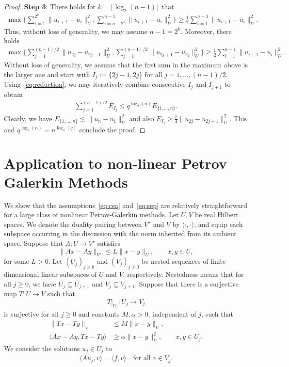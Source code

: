 \documentclass[10pt,reqno]{amsart}
\theoremstyle{definition}
\theoremstyle{remark}
\newcommand{\norm}[1]{\lVert #1\rVert}
\newcommand{\dual}[2]{\langle #1,#2\rangle}
\begin{document}
\begin{proof}
    \textbf{Step 3}: 
    There holds for $k=\lfloor\log_2(n-1)\rfloor$ that
    \begin{align*}
        \max\Big\{\sum_{i=1}^{2^k} \norm{u_{i+1}-u_i}^2_U, \sum_{i=n-2^k}^{n-1} \norm{u_{i+1}-u_i}^2_U\Big\}\geq \frac12 \sum_{i=1}^{n-1} \norm{u_{i+1}-u_i}^2_U.
    \end{align*}
    Thus, without loss of generality, we may assume $n-1=2^k$. Moreover, there holds
    \begin{align*}
        \max\Big\{\sum_{j=1}^{(n-1)/2} \norm{u_{2j}-u_{2j-1}}^2_U, \sum_{j=1}^{(n-1)/2} \norm{u_{2j+1}-u_{2j}}^2_U\Big\}\geq \frac12 \sum_{i=1}^{n-1} \norm{u_{i+1}-u_i}^2_U.
    \end{align*}
    Without loss of generality, we assume that the first sum in the maximum above is the larger one and start with $I_j:= \{2j-1,2j\}$ for all $j=1,\ldots,(n-1)/2$. Using~\eqref{eq:reduction}, we may iteratively combine consecutive $I_j$ and $I_{j+1}$ to obtain
    \begin{align*}
        \sum_{j=1}^{(n-1)/2}E_{I_j}\leq q^{\log_2(n)} E_{\{1,\ldots,n\}}.
    \end{align*}
    Clearly, we have $E_{\{1,\ldots,n\}}\lesssim  \norm{u_n-u_1}_U^2$ and also $E_{I_j}\geq \frac14\norm{u_{2j}-u_{2j-1}}_U^2$.
    This and $q^{\log_2(n)} = n^{\log_2(q)}$ conclude the proof.
\end{proof}

\section{Application to non-linear Petrov Galerkin Methods}\label{sec:pg}
\noindent

We show that the assumptions~\eqref{eq:cea} and~\eqref{eq:sep} are relatively straightforward for a large class of nonlinear Petrov-Galerkin methods.
Let $U,V$ be real Hilbert spaces. We denote the duality pairing between
$V^\star$ and $V$ by $\dual{\cdot}{\cdot}$, and equip each subspace occurring in the discussion
with the norm inherited from its ambient space. Suppose that
$A:U\to V^\star$ satisfies
\begin{equation}\label{eq:pg-lipschitz}
  \norm{Ax-Ay}_{V^\star}\le L\norm{x-y}_U,
  \qquad x,y\in U,
\end{equation}
for some $L>0$. Let $(U_j)_{j\ge0}$ and $(V_j)_{j\ge0}$ be nested
sequences of finite-dimensional linear subspaces of $U$ and $V$,
respectively. Nestedness means that for all $j\ge0$, we have $U_j\subseteq U_{j+1}$ and $V_j\subseteq V_{j+1}$. Suppose that there is a surjective map $T\colon U\to V$ such that
\[
  T|_{U_j}\colon U_j\to V_j
\]
is surjective for all $j\geq 0$ and constants $M,\alpha>0$, independent of $j$, such that
\begin{align}
  \norm{Tx-Ty}_V
  &\le M\norm{x-y}_U,
    \label{eq:pg-map-bound}\\
  \dual{Ax-Ay}{Tx-Ty}
  &\ge\alpha\norm{x-y}_U^2,
    \qquad x,y\in U_j.
    \label{eq:pg-monotonicity}
\end{align}
We consider the solutions $u_j\in U_j$ to
\begin{align}\label{eq:discrete}
    \dual{Au_j}{v}=\dual{f}{v}\quad\text{for all }v\in V_j.
\end{align}
\end{document}
